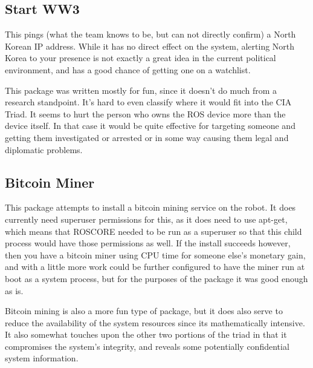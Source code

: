 \documentclass[IEEEtran,letterpaper,10pt,notitlepage,draftclsnofoot]{article}
\begin{document}
\subsection{Start WW3}
This pings (what the team knows to be, but can not directly confirm) a North Korean IP address. 
While it has no direct effect on the system, alerting North Korea to your presence is not exactly a great idea in the current political environment, and has a good chance of getting one on a watchlist. 

This package was written mostly for fun, since it doesn't do much from a research standpoint.
It's hard to even classify where it would fit into the CIA Triad.
It seems to hurt the person who owns the ROS device more than the device itself.
In that case it would be quite effective for targeting someone and getting them investigated or arrested or in some way causing them legal and diplomatic problems.

\subsection{Bitcoin Miner}
This package attempts to install a bitcoin mining service on the robot.
It does currently need superuser permissions for this, as it does need to use apt-get, which means that ROSCORE 
needed to be run as a superuser so that this child process would have those permissions as well.
If the install succeeds however, then you have a bitcoin miner using CPU time for someone else’s monetary gain, and with a 
little more work could be further configured to have the miner run at boot as a system process, but for the purposes of the 
package it was good enough as is.

Bitcoin mining is also a more fun type of package, but it does also serve to reduce the availability of the system resources since its mathematically intensive.
It also somewhat touches upon the other two portions of the triad in that it compromises the system's integrity, and reveals some potentially confidential system information.
\end{document}
